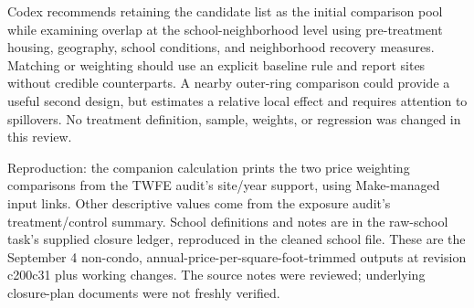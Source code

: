 Codex recommends retaining the candidate list as the initial comparison pool
while examining overlap at the school-neighborhood level using pre-treatment
housing, geography, school conditions, and neighborhood recovery measures.
Matching or weighting should use an explicit baseline rule and report sites
without credible counterparts. A nearby outer-ring comparison could provide
a useful second design, but estimates a relative local effect and requires
attention to spillovers. No treatment definition, sample, weights, or
regression was changed in this review.

{\footnotesize Reproduction: the companion calculation prints the two price
weighting comparisons from the TWFE audit's site/year support, using
Make-managed input links. Other descriptive values come from the exposure
audit's treatment/control summary. School definitions and notes are in the
raw-school task's supplied closure ledger, reproduced in the cleaned school
file. These are the September 4 non-condo, annual-price-per-square-foot-trimmed
outputs at revision c200c31 plus working changes. The source notes were
reviewed; underlying closure-plan documents were not freshly verified.}
